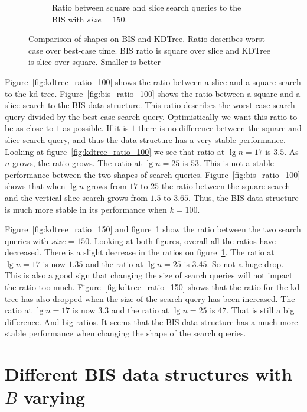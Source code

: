 \begin{figure}[h]
{\begin{subfigure}[b]{0.68\textwidth}
        \caption{Ratio between square and slice search queries to the BIS with $size = 150$.}
        \label{fig:bis_ratio_150}
    \end{subfigure}
  }
  \caption{Comparison of shapes on BIS and KDTree. Ratio describes worst-case over best-case time. BIS ratio is square over slice and KDTree is slice over square. Smaller is better}
  \label{fig:kdtree_bis_ratio_150}
\end{figure}


Figure~\ref{fig:kdtree_ratio_100} shows the ratio between a slice and a square search to the kd-tree. Figure~\ref{fig:bis_ratio_100} shows the ratio between a square and a slice search to the BIS data structure. This ratio describes the worst-case search query divided by the best-case search query. Optimistically we want this ratio to be as close to $1$ as possible. If it is $1$ there is no difference between the square and slice search query, and thus the data structure has a very stable performance. Looking at figure~\ref{fig:kdtree_ratio_100} we see that ratio at $\lg n = 17$ is $3.5$. As $n$ grows, the ratio grows. The ratio at $\lg n = 25$ is $53$. This is not a stable performance between the two shapes of search queries. Figure~\ref{fig:bis_ratio_100} shows that when $\lg n$ grows from $17$ to $25$ the ratio between the square search and the vertical slice search grows from $1.5$ to $3.65$. Thus, the BIS data structure is much more stable in its performance when $k = 100$.

Figure~\ref{fig:kdtree_ratio_150} and figure~\ref{fig:bis_ratio_150} show the ratio between the two search queries with $size = 150$. Looking at both figures, overall all the ratios have decreased. There is a slight decrease in the ratios on figure~\ref{fig:bis_ratio_150}. The ratio at $\lg n = 17$ is now $1.35$ and the ratio at $\lg n = 25$ is $3.45$. So not a huge drop. This is also a good sign that changing the size of search queries will not impact the ratio too much. Figure~\ref{fig:kdtree_ratio_150} shows that the ratio for the kd-tree has also dropped when the size of the search query has been increased. The ratio at $\lg n = 17$ is now $3.3$ and the ratio at $\lg n = 25$ is $47$. That is still a big difference. And big ratios. It seems that the BIS data structure has a much more stable performance when changing the shape of the search queries.

\clearpage

 

\section{Different BIS data structures with $B$ varying}

